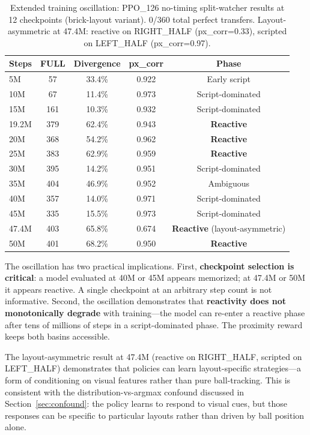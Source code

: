 \documentclass[11pt]{article}
\begin{document}
\begin{table}[ht]
\centering
\begin{tabular}{lcccc}
\toprule
\textbf{Steps} & \textbf{FULL} & \textbf{Divergence} & \textbf{px\_corr} &
\textbf{Phase} \\
\midrule
5M    &  57  & 33.4\% & 0.922 & Early script \\
10M   &  67  & 11.4\% & 0.973 & Script-dominated \\
15M   & 161  & 10.3\% & 0.932 & Script-dominated \\
19.2M & 379  & 62.4\% & 0.943 & \textbf{Reactive} \\
20M   & 368  & 54.2\% & 0.962 & \textbf{Reactive} \\
25M   & 383  & 62.9\% & 0.959 & \textbf{Reactive} \\
30M   & 395  & 14.2\% & 0.951 & Script-dominated \\
35M   & 404  & 46.9\% & 0.952 & Ambiguous \\
40M   & 357  & 14.0\% & 0.971 & Script-dominated \\
45M   & 335  & 15.5\% & 0.973 & Script-dominated \\
47.4M & 403  & 65.8\% & 0.674 & \textbf{Reactive} (layout-asymmetric) \\
50M   & 401  & 68.2\% & 0.950 & \textbf{Reactive} \\
\bottomrule
\end{tabular}
\caption{Extended training oscillation: PPO\_126 no-timing split-watcher
results at 12 checkpoints (brick-layout variant). 0/360 total perfect transfers.
Layout-asymmetric at 47.4M: reactive on RIGHT\_HALF (px\_corr=0.33), scripted on
LEFT\_HALF (px\_corr=0.97).}
\label{tab:oscillation}
\end{table}

The oscillation has two practical implications. First,
\textbf{checkpoint selection is critical}: a model evaluated at 40M or 45M
appears memorized; at 47.4M or 50M it appears reactive. A single checkpoint at
an arbitrary step count is not informative. Second, the oscillation
demonstrates that \textbf{reactivity does not monotonically degrade} with
training---the model can re-enter a reactive phase after tens of millions of
steps in a script-dominated phase. The proximity reward keeps both basins
accessible.

The layout-asymmetric result at 47.4M (reactive on RIGHT\_HALF, scripted on
LEFT\_HALF) demonstrates that policies can learn layout-specific strategies---a
form of conditioning on visual features rather than pure ball-tracking. This is
consistent with the distribution-vs-argmax confound discussed in
Section~\ref{sec:confound}: the policy learns to respond to visual cues, but
those responses can be specific to particular layouts rather than driven by
ball position alone.
\end{document}
